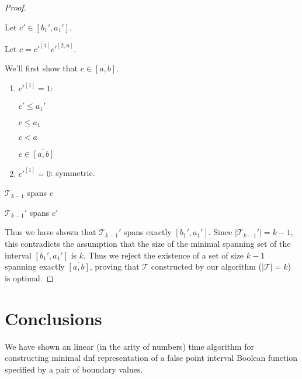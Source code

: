 \documentclass{article}
\theoremstyle{plain}
\theoremstyle{definition}
\newcommand{\interval}[2]{[#1, #2]}
\newcommand{\compl}[1]{\overline{#1}}
\newcommand{\finterval}[2]{\compl{\interval{#1}{#2}}}
\newcommand{\bit}[2]{#1^{[#2]}}
\newcommand{\bits}[3]{#1^{\interval{#2}{#3}}}
\begin{document}
\begin{proof}
\begin{enumerate}
Let $c' \in \interval{b_1'}{a_1'}$.

Let $c = \compl{\bit{c'}{1}} \bits{c'}{2}{n}$.

We'll first show that $c \in \finterval{a}{b}$.

\begin{enumerate}
\item $\bit{c'}{1} = 1$:

$c' \leq a_1'$

$c \leq a_1$

$c < a$

$c \in \finterval{a}{b}$
\item $\bit{c'}{1} = 0$: symmetric.
\end{enumerate}

$\mathcal{T}_{k-1}$ spans $c$

$\mathcal{T}_{k-1}'$ spans $c'$
\end{enumerate}

Thus we have shown that $\mathcal{T}_{k-1}'$
spans exactly $\interval{b_1'}{a_1'}$.
Since $|\mathcal{T}_{k-1}'| = k-1$,
this contradicts the assumption that
the size of the minimal spanning set of the interval
$\interval{b_1'}{a_1'}$ is $k$.
Thus we reject the existence of a set of size $k-1$
spanning exactly $\finterval{a}{b}$,
proving that $\mathcal{T}$ constructed by our algorithm
($|\mathcal{T}| = k$)
is optimal.
\end{proof}

\section{Conclusions}
We have shown an linear (in the arity of numbers) time algorithm
for constructing minimal \acrshort{dnf} representation
of a false point interval Boolean function
specified by a pair of boundary values.



\printglossaries
\end{document}
